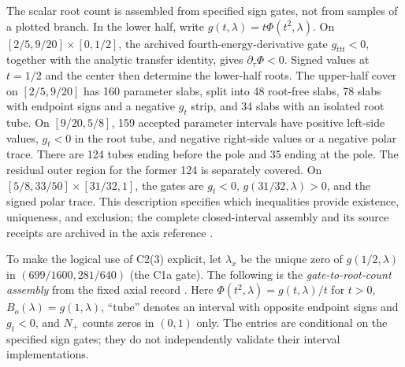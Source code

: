 The scalar root count is assembled from specified sign gates, not from
samples of a plotted branch.  In the lower half, write
$g(t,\lambda)=t\Phi(t^2,\lambda)$.
On $[2/5,9/20]\times[0,1/2]$, the archived fourth-energy-derivative
gate $g_{ttt}<0$, together with the analytic transfer identity,
gives $\partial_\tau\Phi<0$.  Signed values at $t=1/2$ and the center
then determine the lower-half roots.  The upper-half cover on
$[2/5,9/20]$ has 160 parameter slabs, split into 48 root-free slabs,
78 slabs with endpoint signs and a negative $g_t$ strip, and
34 slabs with an isolated root tube.  On $[9/20,5/8]$, 159 accepted
parameter intervals have positive left-side values, $g_t<0$ in the
root tube, and negative right-side values or a negative polar trace.
There are 124 tubes ending before the pole and 35 ending at the pole.
The residual outer region for the former 124 is separately covered.
On $[5/8,33/50]\times[31/32,1]$, the gates are $g_t<0$,
$g(31/32,\lambda)>0$, and the signed polar trace.  This description
specifies which inequalities provide existence, uniqueness, and exclusion;
the complete closed-interval assembly and its source receipts are archived
in the axis reference \citep{data-oblate-axis}.

To make the logical use of C2(3) explicit, let $\lambda_x$ be the
unique zero of $g(1/2,\lambda)$ in
$(699/1600,281/640)$ (the C1a gate).  The following is the
\emph{gate-to-root-count assembly} from the fixed axial record
\citep{data-oblate-axis}.  Here $\Phi(t^2,\lambda)=g(t,\lambda)/t$
for $t>0$, $B_o(\lambda)=g(1,\lambda)$, ``tube'' denotes an interval
with opposite endpoint signs and $g_t<0$, and $N_+$ counts zeros in
$(0,1)$ only.  The entries are conditional on the specified sign gates;
they do not independently validate their interval implementations.

